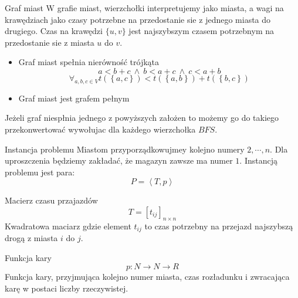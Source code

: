 \begin{frame}
	\begin{block}{Graf miast}
		W grafie miast, wierzchołki interpretujemy jako miasta, a wagi na krawędziach jako czasy potrzebne na przedostanie sie z jednego miasta do drugiego.
		Czas na krawędzi $\{u, v\}$ jest najszybszym czasem potrzebnym na przedostanie sie z miasta $u$ do $v$.
		\begin{itemize}
			\item Graf miast spełnia nierówność trójkąta
				\begin{equation}
					a < b + c \ \wedge \ b < a + c \ \wedge \ c < a + b
				\end{equation}
				\begin{equation}
					\forall_{a,b,c \in V} t(\left\{a, c\right\}) < t(\left\{a, b\right\}) + t(\left\{b, c\right\})
				\end{equation}
			\item Graf miast jest grafem pełnym
		\end{itemize}
		Jeżeli graf niespłnia jednego z powyższych założen to możemy go do takiego przekonwertować wywołujac dla każdego wierzchołka $BFS$.
	\end{block}
\end{frame}

\begin{frame}
	\begin{block}{Instancja problemu}
		Miastom przyporządkowujmey kolejno numery $2, \cdots, n$.
		Dla uproszczenia będziemy zakładać, że magazyn zawsze ma numer $1$.
		Instancją problemu jest para:
		\begin{equation}
			P = \left< T, p \right>
		\end{equation}
	\end{block}
	\begin{block}{Macierz czasu przajazdów}		
		\begin{equation}
			T = \left[ t_{ij} \right]_{n \times n} 
		\end{equation}
		Kwadratowa maciarz gdzie element $t_{ij}$ to czas potrzebny na przejazd najszybszą drogą z miasta $i$ do $j$.
	\end{block}
	\begin{block}{Funkcja kary}
		\begin{equation}
			p : N \rightarrow N \rightarrow R 
		\end{equation}
		Funkcja kary, przyjmująca kolejno numer miasta, czas rozładunku i zwracająca karę w postaci liczby rzeczywistej.
	\end{block}
\end{frame}

